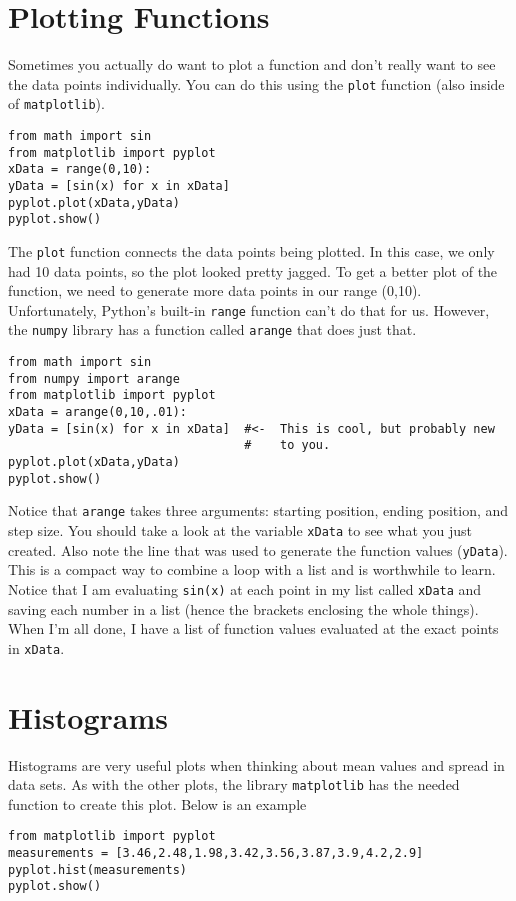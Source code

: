 \section{Plotting Functions}

Sometimes you actually do want to plot a function and don't really
want to see the data points individually.  You can do this using the
\texttt{plot} function (also inside of \texttt{matplotlib}).
\begin{Verbatim}
from math import sin
from matplotlib import pyplot
xData = range(0,10):
yData = [sin(x) for x in xData]
pyplot.plot(xData,yData)
pyplot.show()
\end{Verbatim}
The \texttt{plot} function connects the data points being plotted.  In
this case, we only had 10 data points, so the plot looked pretty
jagged.  To get a better plot of the function, we need to generate
more data points in our range (0,10).  Unfortunately, Python's
built-in \texttt{range} function can't do that for us.  However, the
\texttt{numpy} library has a function called \texttt{arange} that does
just that.
\begin{Verbatim}
from math import sin
from numpy import arange
from matplotlib import pyplot
xData = arange(0,10,.01):
yData = [sin(x) for x in xData]  #<-  This is cool, but probably new
                                 #    to you.
pyplot.plot(xData,yData)
pyplot.show()
\end{Verbatim}
Notice that \texttt{arange} takes three arguments: starting position,
ending position, and step size.  You should take a look at the
variable \texttt{xData} to see what you just created.  Also note the
line that was used to generate the function values (\texttt{yData}).
This is a compact way to combine a loop with a list and is worthwhile
to learn.  Notice that I am evaluating \texttt{sin(x)} at each point
in my list called \texttt{xData} and saving each number in a list
(hence the brackets enclosing the whole things).  When
I'm all done, I have a list of function values evaluated at the exact
points in \texttt{xData}.

\section{Histograms}
Histograms are very useful plots when thinking about mean values and
spread in data sets.  As with the other plots, the library
\texttt{matplotlib} has the needed function to create this plot.
Below is an example
\begin{Verbatim}
from matplotlib import pyplot
measurements = [3.46,2.48,1.98,3.42,3.56,3.87,3.9,4.2,2.9]
pyplot.hist(measurements)
pyplot.show()
\end{Verbatim}


